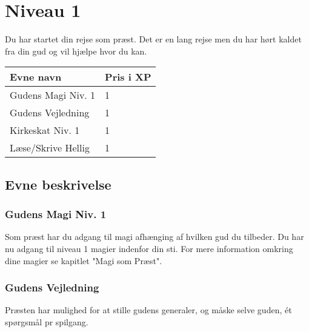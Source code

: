 \chapter{Niveau 1}
Du har startet din rejse som præst. Det er en lang rejse men du har hørt kaldet fra din gud og vil hjælpe hvor du kan.

\begin{table}[H]
    \centering
    \begin{tabular}{|p{}|p{}|}
    \rowcolor{cerulean!80}\hline
        Evne navn & Pris i XP \\\hline
            Gudens Magi Niv. 1 & 1 \\\hline
            Gudens Vejledning & 1 \\\hline
            Kirkeskat Niv. 1 & 1 \\\hline
            Læse/Skrive Hellig & 1 \\\hline
    \end{tabular}
\end{table}

\section{Evne beskrivelse}


\subsection{Gudens Magi Niv. 1}
Som præst har du adgang til magi afhænging af hvilken gud du tilbeder. Du har nu adgang til niveau 1 magier indenfor din sti. For mere information omkring dine magier se kapitlet "Magi som Præst".

\subsection{Gudens Vejledning}
Præsten har mulighed for at stille gudens generaler, og måske selve guden, ét spørgsmål pr spilgang.



